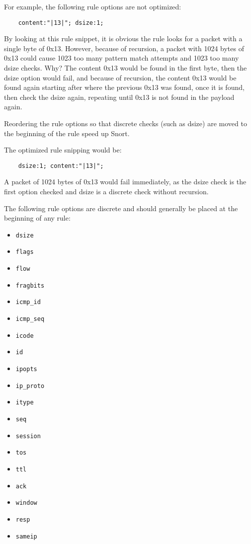 \documentclass[english]{report}
\begin{document}
For example, the following rule options are not optimized:

\begin{verbatim}
    content:"|13|"; dsize:1;
\end{verbatim}

By looking at this rule snippet, it is obvious the rule looks for a packet with
a single byte of 0x13.  However, because of recursion, a packet with 1024 bytes
of 0x13 could cause 1023 too many pattern match attempts and 1023 too many
dsize checks.  Why?  The content 0x13 would be found in the first byte, then
the dsize option would fail, and because of recursion, the content 0x13 would
be found again starting after where the previous 0x13 was found, once it is
found, then check the dsize again, repeating until 0x13 is not found in the
payload again.

Reordering the rule options so that discrete checks (such as dsize) are moved
to the beginning of the rule speed up Snort.  

The optimized rule snipping would be:
\begin{verbatim}
    dsize:1; content:"|13|";
\end{verbatim}

A packet of 1024 bytes of 0x13 would fail immediately, as the dsize check is
the first option checked and dsize is a discrete check without recursion.

The following rule options are discrete and should generally be placed at the
beginning of any rule:

\begin{itemize}
\item \texttt{dsize}
\item \texttt{flags}
\item \texttt{flow}
\item \texttt{fragbits}
\item \texttt{icmp\_id}
\item \texttt{icmp\_seq} 
\item \texttt{icode} 
\item \texttt{id}
\item \texttt{ipopts}
\item \texttt{ip\_proto} 
\item \texttt{itype} 
\item \texttt{seq}
\item \texttt{session} 
\item \texttt{tos}
\item \texttt{ttl}
\item \texttt{ack}
\item \texttt{window}
\item \texttt{resp} 
\item \texttt{sameip}
\end{itemize}
\end{document}
